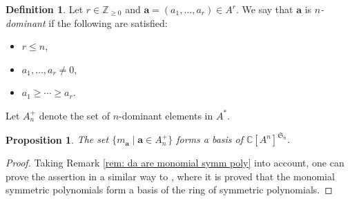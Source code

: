 \documentclass[12pt,a4paper]{amsart}
\newtheorem{prop}[thm]{Proposition}
\theoremstyle{definition}
\newtheorem{defi}[thm]{Definition}
\numberwithin{equation}{subsection}
\begin{document}
\begin{defi}
  Let $r \in \mathbb{Z}_{\geq 0}$ and $\mathbf{a} = (a_1,\dots,a_r) \in A^r$.
  We say that $\mathbf{a}$ is \emph{$n$-dominant} if the following are satisfied:
  \begin{itemize}
    \item $r \leq n$,
    \item $a_1,\dots,a_r \neq 0$,
    \item $a_1 \geq \cdots \geq a_r$.
  \end{itemize}
  Let $A_n^+$ denote the set of $n$-dominant elements in $A^*$.
\end{defi}

\begin{prop}\label{prop: basis of inv ring}
  The set $\{ m_\mathbf{a} \mid \mathbf{a} \in A_n^+ \}$ forms a basis of $\mathbb{C}[A^n]^{\mathfrak{S}_n}$.
\end{prop}
\begin{proof}
  Taking Remark \ref{rem: da are monomial symm poly} into account, one can prove the assertion in a similar way to \cite[Section 2]{Mac79}, where it is proved that the monomial symmetric polynomials form a basis of the ring of symmetric polynomials.
\end{proof}
\end{document}
